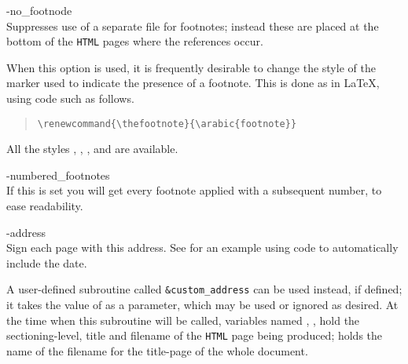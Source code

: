 \begin{htmllist}
%
%

\item [ -no\_footnode\label{cs_nofootnode}]
\\
Suppresses use of a separate file for footnotes;
instead these are placed at the bottom of the \texttt{HTML} pages
where the references occur.

When this option is used, it is frequently desirable to change the
style of the marker used to indicate the presence of a footnote.
This is done as in \LaTeX, using code such as follows.
\begin{quote}
\verb|\renewcommand{\thefootnote}{\arabic{footnote}}|
\end{quote}
All the styles , , ,  and 
are available.

\begin{changebar}
\item [ -numbered\_footnotes\label{cs_numbered_footnotes}]
\\
If this is set you will get every footnote applied with a subsequent
number, to ease readability.
\end{changebar}

%
%

\item [ -address \Meta{author-address}\label{cs_address}]
\\
Sign each page with this address.\html{\\}
See  for an example using \Perl{} code
to automatically include the date.

\begin{changebar}
A user-defined \Perl{} subroutine called \texttt{\&custom\_address}
can be used instead, if defined; it takes the value of 
as a parameter, which may be used or ignored as desired.
At the time when this subroutine will be called,
variables named , , 
hold the sectioning-level, title and filename of the \texttt{HTML} page
being produced;  holds the name of the filename for the title-page
of the whole document.
\end{changebar}


\end{htmllist}
